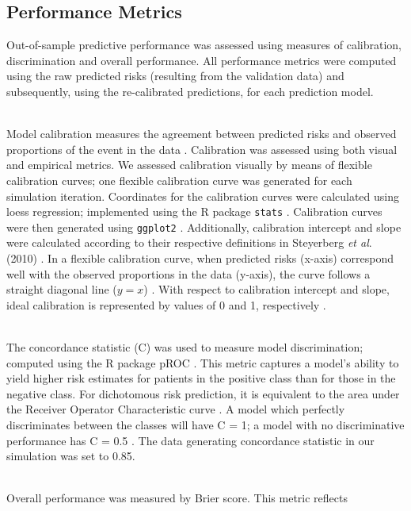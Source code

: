\documentclass[AMA,STIX1COL,]{WileyNJD-v2}
\begin{document}
\hypertarget{performance-metrics}{%
\subsection{Performance Metrics}\label{performance-metrics}}

\hfill\break
Out-of-sample predictive performance was assessed using measures of
calibration, discrimination and overall performance. All performance
metrics were computed using the raw predicted risks (resulting from the
validation data) and subsequently, using the re-calibrated predictions,
for each prediction model.\\
\strut \\
Model calibration measures the agreement between predicted risks and
observed proportions of the event in the data \citep{achilles}.
Calibration was assessed using both visual and empirical metrics. We
assessed calibration visually by means of flexible calibration curves;
one flexible calibration curve was generated for each simulation
iteration. Coordinates for the calibration curves were calculated using
loess regression; implemented using the R package \texttt{stats}
\citep{r}. Calibration curves were then generated using \texttt{ggplot2}
\citep{gg}. Additionally, calibration intercept and slope were
calculated according to their respective definitions in Steyerberg
\emph{et al}. (2010) \citep{epi}. In a flexible calibration curve, when
predicted risks (x-axis) correspond well with the observed proportions
in the data (y-axis), the curve follows a straight diagonal line
(\(y = x\)) \citep{achilles}. With respect to calibration intercept and
slope, ideal calibration is represented by values of 0 and 1,
respectively \citep{epi}.\\
\strut \\
The concordance statistic (C) was used to measure model discrimination;
computed using the R package pROC \citep{pROC}. This metric captures a
model's ability to yield higher risk estimates for patients in the
positive class than for those in the negative class. For dichotomous
risk prediction, it is equivalent to the area under the Receiver
Operator Characteristic curve \citep{epi}. A model which perfectly
discriminates between the classes will have C = 1; a model with no
discriminative performance has C = 0.5 \citep{epi}. The data generating
concordance statistic in our simulation was set to 0.85.\\
\strut \\
Overall performance was measured by Brier score. This metric reflects
\end{document}
